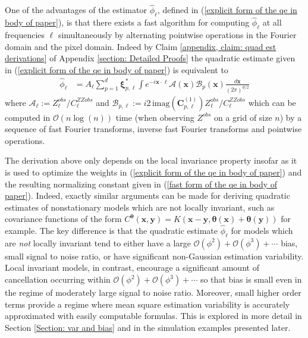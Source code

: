 \documentclass[10pt,noinfoline]{imsart}
\newcommand{\bs}{\boldsymbol}
\begin{document}
One of the advantages of the estimator $\hat\phi_{\bs \ell}$, defined in (\ref{explicit form of the qe in body of paper}), is that there exists a fast algorithm for computing $\hat\phi_{\bs \ell}$ at all frequencies $\bs \ell$ simultaneously by alternating pointwise operations in the Fourier domain and the pixel domain. Indeed by Claim \ref{appendix, claim: quad est derivations} of Appendix \ref{section: Detailed Proofs} the quadratic estimate given in (\ref{explicit form of the qe in body of paper}) is equivalent to
\begin{align}
    \label{fast form of the qe in body of paper}
    \hat\phi_{\bs \ell}
    &=   A_{\bs \ell}\sum_{p=1}^d \bs\xi^*_{p,\bs \ell} \int 
        e^{-i\bs x\cdot\bs \ell} \mathscr A(\bs x)\mathscr B_{p}(\bs x)\frac{d\bs x}{{(2\pi)}^{d/2}}
\end{align}
where $\mathscr A_{\bs \ell}:= Z^{obs}_{\bs \ell}/ C^{ZZobs}_{\bs \ell}$ and $\mathscr B_{p,\bs \ell} := i 2  \, \textrm{imag}(\bs C^{(1)}_{p,\bs \ell}) Z^{obs}_{\bs\ell} / C^{ZZobs}_{\bs\ell}$ which  can be computed in $\mathcal O(n\log(n))$ time (when observing $Z^{obs}$ on a grid of size $n$) by a sequence of fast Fourier transforms, inverse fast Fourier transforms and pointwise operations.

The derivation above only depends on the local invariance property insofar as it is used to optimize the weights  in (\ref{explicit form of the qe in body of paper}) and the resulting normalizing constant given in (\ref{fast form of the qe in body of paper}). Indeed, exactly similar arguments can be made for deriving quadratic estimates of nonstationary models which are not locally invariant, such as covariance functions of the form $C^{\bs\theta}(\bs x,\bs y)=K(\bs x-\bs y,\bs\theta(\bs x)+\bs\theta(\bs y))$ for example. The key difference is that the quadratic estimate $\hat \phi_{\bs \ell}$ for models which are {\it not} locally invariant  tend to either have a large  $\mathcal O(\phi^2)+ \mathcal O(\phi^3)+\cdots$ bias,  small signal to noise ratio, or have significant non-Gaussian estimation variability. Local invariant models, in contrast, encourage a significant amount of cancellation occurring within $\mathcal O(\phi^2)+ \mathcal O(\phi^3)+\cdots$ so that bias is small even in the regime of moderately large signal to noise ratio. Moreover, small higher order terms provide a regime where mean square estimation variability is accurately approximated with easily computable formulas. This is explored in more detail in Section \ref{Section: var and bias} and in the simulation examples presented later.
\end{document}
